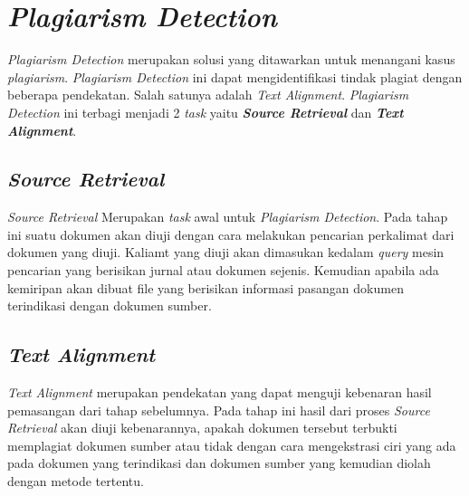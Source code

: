 \documentclass[../Proposal.tex]{subfiles}
\begin{document}
	\section{\textit{Plagiarism Detection}}
	\textit{Plagiarism Detection} merupakan solusi yang ditawarkan untuk menangani kasus \textit{plagiarism}. \textit{Plagiarism Detection} ini dapat mengidentifikasi tindak plagiat dengan beberapa pendekatan. Salah satunya adalah \textit{Text Alignment}. \textit{Plagiarism Detection} ini terbagi menjadi 2 \textit{task} yaitu \textit{\textbf{Source Retrieval}} dan \textit{\textbf{Text Alignment}}\cite{pan-task-2014}.
	
		\subsection{\textit{Source Retrieval}}
		\textit{Source Retrieval} Merupakan \textit{task} awal untuk \textit{Plagiarism Detection}. Pada tahap ini suatu dokumen akan diuji dengan cara melakukan pencarian perkalimat dari dokumen yang diuji. Kaliamt yang diuji akan dimasukan kedalam \textit{query} mesin pencarian yang berisikan jurnal atau dokumen sejenis. Kemudian apabila ada kemiripan akan dibuat file yang berisikan informasi pasangan dokumen terindikasi dengan dokumen sumber\cite{information-retrieval}.
		
		\subsection{\textit{Text Alignment}}
		\textit{Text Alignment} merupakan pendekatan yang dapat menguji kebenaran hasil pemasangan dari tahap sebelumnya. Pada tahap ini hasil dari proses \textit{Source Retrieval} akan diuji kebenarannya, apakah dokumen tersebut terbukti memplagiat dokumen sumber atau tidak dengan cara mengekstrasi ciri yang ada pada dokumen yang terindikasi dan dokumen sumber yang kemudian diolah dengan metode tertentu. 
\end{document}
